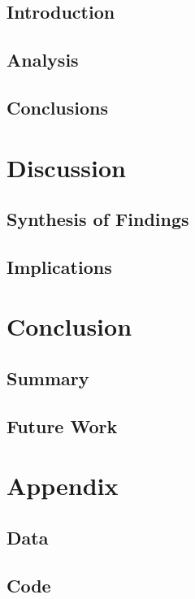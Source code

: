 \documentclass[a4paper, english]{article}
\begin{document}
    \subsection{Introduction}
    \subsection{Analysis}
    \subsection{Conclusions}

\section{Discussion}
    \subsection{Synthesis of Findings}
    \subsection{Implications}

\section{Conclusion}
    \subsection{Summary}
    \subsection{Future Work}

\section{Appendix}
    \subsection{Data}
    \subsection{Code}


\newpage
\printbibliography
\end{document}
